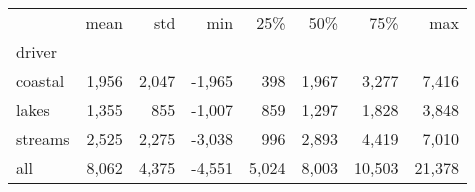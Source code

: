 \begin{tabular}{lrrrrrrr}
\toprule
 & mean & std & min & 25\% & 50\% & 75\% & max \\
driver &  &  &  &  &  &  &  \\
\midrule
coastal & 1,956 & 2,047 & -1,965 & 398 & 1,967 & 3,277 & 7,416 \\
lakes & 1,355 & 855 & -1,007 & 859 & 1,297 & 1,828 & 3,848 \\
streams & 2,525 & 2,275 & -3,038 & 996 & 2,893 & 4,419 & 7,010 \\
all & 8,062 & 4,375 & -4,551 & 5,024 & 8,003 & 10,503 & 21,378 \\
\bottomrule
\end{tabular}
